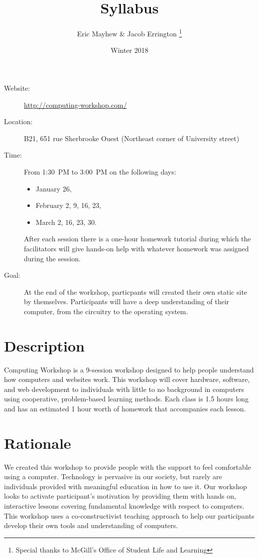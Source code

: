 \documentclass[11pt]{article}
\author{%
  Eric Mayhew \& Jacob Errington%
  \footnote{Special thanks to McGill's Office of Student Life and Learning}
}
\title{Syllabus}
\date{Winter 2018}
\begin{document}
\maketitle

\begin{description}
  \item[Website:]
    \url{http://computing-workshop.com/}

  \item[Location:]
    B21, 651 rue Sherbrooke Ouest
    (Northeast corner of University street)

  \item[Time:]
    From 1:30~PM to 3:00~PM on the following days:
    \begin{itemize}
      \item January 26,
      \item February 2, 9, 16, 23,
      \item March 2, 16, 23, 30.
    \end{itemize}

    After each session there is a one-hour homework tutorial during which the
    facilitators will give hands-on help with whatever homework was assigned
    during the session.

  \item[Goal:]
    At the end of the workshop, particpants will created their own static site
    by themselves. Participants will have a deep understanding of their
    computer, from the circuitry to the operating system.
\end{description}

\section*{Description}

Computing Workshop is a 9-session workshop designed to help people understand
how computers and websites work. This workshop will cover hardware, software,
and web development to individuals with little to no background in computers
using cooperative, problem-based learning methods. Each class is 1.5 hours long
and has an estimated 1 hour worth of homework that accompanies each lesson.

\section*{Rationale}

We created this workshop to provide people with the support to feel comfortable
using a computer. Technology is pervasive in our society, but rarely are
individuals provided with meaningful education in how to use it. Our workshop
looks to activate participant's motivation by providing them with hands on,
interactive lessons covering fundamental knowledge with respect to computers.
This workshop uses a co-constructivist teaching approach to help our
participants develop their own tools and understanding of computers.
\end{document}
